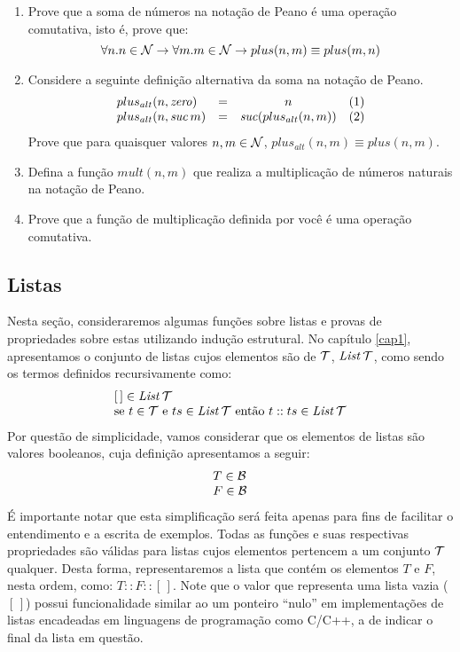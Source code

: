 \begin{enumerate}
  \item Prove que a soma de números na notação de Peano é uma operação
    comutativa, isto é, prove que:
   \[
   \forall n. n\in\mathcal{N}\to \forall m. m\in\mathcal{N}\to plus(n,m) \equiv plus(m,n)
   \]
  \item Considere a seguinte definição alternativa da soma na notação
    de Peano.
\[
\begin{array}{lccc}
plus_{alt}(n,\textit{zero\/}) & = & n & (1)\\
plus_{alt}(n,\textit{suc\/}\,m) & = & \textit{suc\/}(plus_{alt}(n,m)) & (2)
\end{array}
\]
Prove que para quaisquer valores $n,m\in\mathcal{N}$, $plus_{alt}(n,m) \equiv
plus(n,m)$.
  \item Defina a função $mult(n,m)$ que realiza a multiplicação de
    números naturais na notação de Peano.
  \item Prove que a função de multiplicação definida por você é uma
    operação comutativa.
\end{enumerate}


\subsection{Listas}

Nesta seção, consideraremos algumas funções sobre listas e provas de
propriedades sobre estas utilizando indução estrutural. No capítulo
\ref{cap1}, apresentamos o conjunto de listas cujos elementos são de $\mathcal{T}$,
 $\textit{List\/}\, \mathcal{T}$, como sendo os termos definidos recursivamente como:
  \[
  \begin{array}{l}
    [\,] \in \textit{List\/}\,\mathcal{T} \\
    \text{se $t \in \mathcal{T}$ e $ts \in \textit{List\/}\,\mathcal{T}$ ent\~ao  $t :: ts \in \textit{List\/}\,\mathcal{T}$}
  \end{array}
  \]
Por questão de simplicidade, vamos considerar que os elementos de
listas são valores booleanos, cuja definição apresentamos a seguir:
  \[
      \begin{array}{l}
        T \in\mathcal{B}\\
        F \in\mathcal{B}
      \end{array}
  \]
É importante notar que esta simplificação será feita apenas para fins
de facilitar o entendimento e a escrita de exemplos. Todas as funções
e suas respectivas propriedades são válidas para listas cujos
elementos pertencem a um conjunto $\mathcal{T}$ qualquer. Desta forma,
representaremos a lista que contém os elementos $T$ e $F$, nesta
ordem, como: $T :: F :: [\,]$. Note que o valor que representa uma
lista vazia ($[\,]$) possui funcionalidade similar ao um ponteiro
``nulo'' em implementações de listas encadeadas em linguagens de
programação como C/C++, a de indicar o final da lista em questão.

